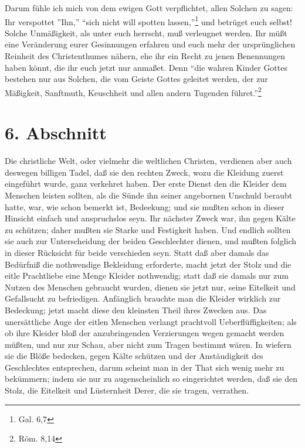 \medskip

Darum fühle ich mich von dem ewigen Gott verpflichtet, allen Solchen zu sagen:
Ihr verspottet ''Ihn,'' "`sich nicht will spotten lassen,"'\footnote{Gal. 6,7}
und betrüget euch selbst! Solche Unmäßigkeit, als unter euch herrscht, muß
verleugnet werden. Ihr müßt eine Veränderung eurer Gesinnungen erfahren und euch
mehr der ursprünglichen Reinheit des Christenthumes nähern, ehe ihr ein Recht zu
jenen Benennungen haben könnt, die ihr euch jetzt nur anmaßet. Denn "`die wahren
Kinder Gottes bestehen nur aus Solchen, die vom Geiste Gottes geleitet werden,
der zur Mäßigkeit, Sanftmuth, Keuschheit und allen andern Tugenden
führet."'\footnote{Röm. 8,14}

\section{6. Abschnitt}

Die christliche Welt, oder vielmehr die weltlichen Christen, verdienen aber auch
deswegen billigen Tadel, daß sie den rechten Zweck, wozu die Kleidung zuerst
eingeführt wurde, ganz verkehret haben. Der erste Dienst den die Kleider dem
Menschen leisten sollten, als die Sünde ihn seiner angebornen Unschuld beraubt
hatte, war, wie schon bemerkt ist, Bedeekung; und sie mußten schon in dieser
Hinsicht einfach und anspruchslos seyn. Ihr nächster Zweck war, ihn gegen Kälte
zu schützen; daher mußten sie Starke und Festigkeit haben. Und endlich sollten
sie auch zur Unterscheidung der beiden Geschlechter dienen, und mußten folglich
in dieser Rücksicht für beide verschieden seyn. Statt daß aber damals das
Bedürfniß die nothwendige Bekleidung erforderte, macht jetzt der Stolz und die
eitle Prachtliebe eine Menge Kleider nothwendig; statt daß sie damals nur zum
Nutzen des Menschen gebraucht wurden, dienen sie jetzt nur, seine Eitelkeit und
Gefallsucht zu befriedigen. Anfänglich brauchte man die Kleider wirklich zur
Bedeckung; jetzt macht diese den kleinsten Theil ihres Zwecken aus. Das
unersättliche Auge der eitlen Menschen verlangt prachtvoll Ueberflüffigkeiten;
als ob ihre Kleider bloß der anzubringenden Verzierungen wegen gemacht werden
müßten, und nur zur Schau, aber nicht zum Tragen bestimmt wären. In wiefern sie
die Blöße bedecken, gegen Kälte schützen und der Anstäudigkeit des Geschlechtes
entsprechen, darum scheint man in der That sich wenig mehr zu bekümmern; indem
sie nur zu augenscheinlich so eingerichtet werden, daß sie den Stolz, die
Eitelkeit und Lüsternheit Derer, die sie tragen, verrathen.

